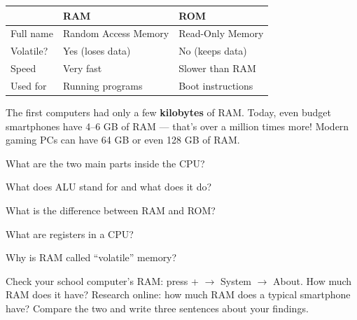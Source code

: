 \begin{theorybox}
\begin{tabular}{lll}
  & \textbf{RAM} & \textbf{ROM} \\
  \midrule
  Full name & Random Access Memory & Read-Only Memory \\
  Volatile? & Yes (loses data) & No (keeps data) \\
  Speed & Very fast & Slower than RAM \\
  Used for & Running programs & Boot instructions \\
\end{tabular}
\end{theorybox}


\begin{funfact}
The first computers had only a few \textbf{kilobytes} of RAM. Today, even budget smartphones have 4--6 GB of RAM --- that's over a million times more! Modern gaming PCs can have 64 GB or even 128 GB of RAM.
\end{funfact}

\begin{reviewqs}
  \item What are the two main parts inside the CPU?
  \item What does ALU stand for and what does it do?
  \item What is the difference between RAM and ROM?
  \item What are registers in a CPU?
  \item Why is RAM called ``volatile'' memory?
\end{reviewqs}

\begin{challenge}
Check your school computer's RAM: press + $\rightarrow$ System $\rightarrow$ About. How much RAM does it have? Research online: how much RAM does a typical smartphone have? Compare the two and write three sentences about your findings.
\end{challenge}
